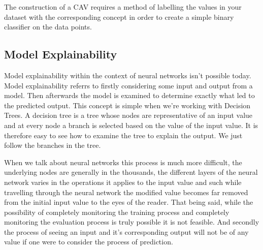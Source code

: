The construction of a CAV requires a method of labelling the values in your dataset with
the corresponding concept in order to create a simple binary classifier on the data points.

\subsection{Model Explainability}

Model explainability within the context of neural networks isn't possible today. Model
explainability referrs to firstly considering some input and output from a model. Then
afterwards the model is examined to determine exactly what led to the predicted output.
This concept is simple when we're working with Decision Trees. A decision tree is a tree
whose nodes are representative of an input value and at every node a branch is selected
based on the value of the input value. It is therefore easy to see how to examine the tree
to explain the output. We just follow the branches in the tree.


When we talk about neural networks this process is much more difficult, the underlying nodes
are generally in the thousands, the different layers of the neural network varies in the operations
it applies to the input value and such while travelling through the neural network the modified
value becomes far removed from the initial input value to the eyes of the reader. That being said,
while the possibility of completely monitoring the training process and completely monitoring the
evaluation process is truly possible it is not feasible. And secondly the process of seeing an
input and it's corresponding output will not be of any value if one were to consider the process
of prediction.


